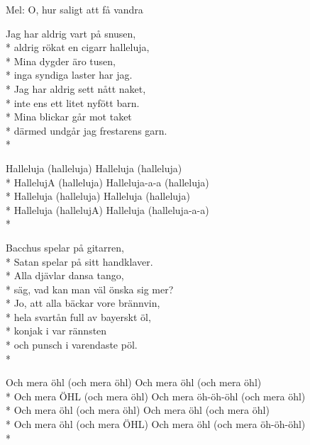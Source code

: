 \begin{SongText}
    \begin{SongInfo}
        Mel: O, hur saligt att få vandra
    \end{SongInfo}
    \begin{SongVerse}
        Jag har aldrig vart på snusen,\\*%
        aldrig rökat en cigarr halleluja,\\*%
        Mina dygder äro tusen,\\*%
        inga syndiga laster har jag.\\*%
        Jag har aldrig sett nått naket,\\*%
        inte ens ett litet nyfött barn.\\*%
        Mina blickar går mot taket\\*%
        därmed undgår jag frestarens garn.\\*%
    \end{SongVerse}
    \begin{SongVerse}
        Halleluja (halleluja) Halleluja (halleluja)\\*%
        HallelujA (halleluja) Halleluja-a-a (halleluja)\\*%
        Halleluja (halleluja) Halleluja (halleluja)\\*%
        Halleluja (hallelujA) Halleluja (halleluja-a-a)\\*%
    \end{SongVerse}
    \begin{SongVerse}
        Bacchus spelar på gitarren,\\*%
        Satan spelar på sitt handklaver.\\*%
        Alla djävlar dansa tango,\\*%
        säg, vad kan man väl önska sig mer?\\*%
        Jo, att alla bäckar vore brännvin,\\*%
        hela svartån full av bayerskt öl,\\*%
        konjak i var rännsten\\*%
        och punsch i varendaste pöl.\\*%
    \end{SongVerse}
    \begin{SongVerse}
        Och mera öhl (och mera öhl) Och mera öhl (och mera öhl)\\*%
        Och mera ÖHL (och mera öhl) Och mera öh-öh-öhl (och mera öhl)\\*%
        Och mera öhl (och mera öhl) Och mera öhl (och mera öhl)\\*%
        Och mera öhl (och mera ÖHL) Och mera öhl (och mera öh-öh-öhl)\\*%
    \end{SongVerse}
\end{SongText}
